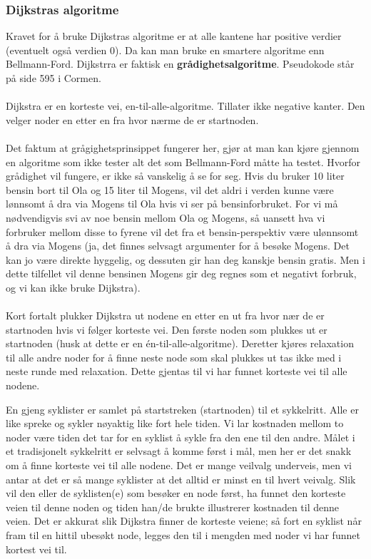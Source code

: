 \subsubsection{Dijkstras algoritme}
Kravet for å bruke Dijkstras algoritme er at alle kantene har positive verdier (eventuelt også verdien 0). Da kan man bruke en smartere algoritme enn Bellmann-Ford. Dijkstrra er faktisk en \textbf{grådighetsalgoritme}. Pseudokode står på side 595 i Cormen.
\\\\
Dijkstra er en korteste vei, en-til-alle-algoritme. Tillater ikke negative kanter. Den velger noder en etter en fra hvor nærme de er startnoden. 
\\\\
Det faktum at grågighetsprinsippet fungerer her, gjør at man kan kjøre gjennom en algoritme som ikke tester alt det som Bellmann-Ford måtte ha testet. Hvorfor grådighet vil fungere, er ikke så vanskelig å se for seg. Hvis du bruker 10 liter bensin bort til Ola og 15 liter til Mogens, vil det aldri i verden kunne være lønnsomt å dra via Mogens til Ola hvis vi ser på bensinforbruket. For vi må nødvendigvis svi av noe bensin mellom Ola og Mogens, så uansett hva vi forbruker mellom disse to fyrene vil det fra et bensin-perspektiv være ulønnsomt å dra via Mogens (ja, det finnes selvsagt argumenter for å besøke Mogens. Det kan jo være direkte hyggelig, og dessuten gir han deg kanskje bensin gratis. Men i dette tilfellet vil denne bensinen Mogens gir deg regnes som et negativt forbruk, og vi kan ikke bruke Dijkstra).
\\\\
Kort fortalt plukker Dijkstra ut nodene en etter en ut fra hvor nær de er startnoden hvis vi følger korteste vei. Den første noden som plukkes ut er startnoden (husk at dette er en én-til-alle-algoritme). Deretter kjøres relaxation til alle andre noder for å finne neste node som skal plukkes ut tas ikke med i neste runde med relaxation. Dette gjentas til vi har funnet korteste vei til alle nodene. 

\begin{boxed}
En gjeng syklister er samlet på startstreken (startnoden) til et sykkelritt. Alle er like spreke og sykler nøyaktig like fort hele tiden. Vi lar kostnaden mellom to noder være tiden det tar for en syklist å sykle fra den ene til den andre. Målet i et tradisjonelt sykkelritt er selvsagt å komme først i mål, men her er det snakk om å finne korteste vei til alle nodene.\newline\newline
Det er mange veilvalg underveis, men vi antar at det er så mange syklister at det alltid er minst en til hvert veivalg. Slik vil den eller de syklisten(e) som besøker en node først, ha funnet den korteste veien til denne noden og tiden han/de brukte illustrerer kostnaden til denne veien.
\newline\newline
Det er akkurat slik Dijkstra finner de korteste veiene; så fort en syklist når fram til en hittil ubesøkt node, legges den til i mengden med noder vi har funnet kortest vei til.
\end{boxed}


